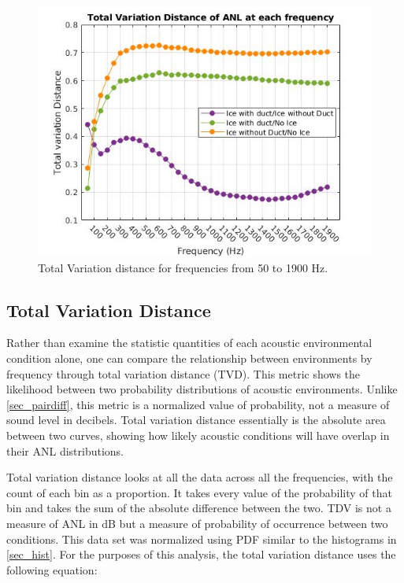\begin{figure}[p]
\centering
\includegraphics[scale=0.62]{Figures/recolor_total_var_dist_norm_pdf.jpg}
\caption{Total Variation distance for frequencies from 50 to 1900 Hz.}
\label{fig_totvardist}
\end{figure}

\subsection{Total Variation Distance} \label{sec_tvd}
Rather than examine the statistic quantities of each acoustic environmental condition alone, one can compare the relationship between environments by frequency through total variation distance (TVD). This metric shows the likelihood between two probability distributions of acoustic environments. Unlike \autoref{sec_pairdiff}, this metric is a normalized value of probability, not a measure of sound level in decibels. Total variation distance essentially is the absolute area between two curves, showing how likely acoustic conditions will have overlap in their ANL distributions. 

 Total variation distance looks at all the data across all the frequencies, with the count of each bin as a proportion. It takes every value of the probability of that bin and takes the sum of the absolute difference between the two. TDV is not a measure of ANL in dB but a measure of probability of occurrence between two conditions. This data set was normalized using PDF similar to the histograms in \autoref{sec_hist}. For the purposes of this analysis, the total variation distance uses the following equation: 

